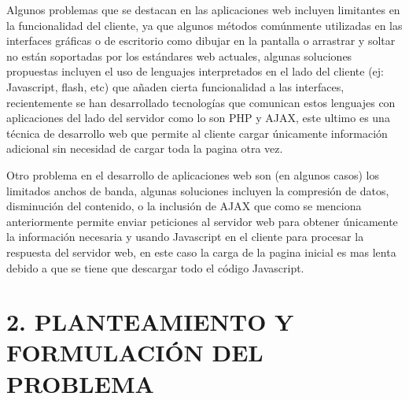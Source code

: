 \documentclass[12pt,letterpaper,oneside]{article}
\begin{document}
\bigskip

{\mdseries\upshape
Algunos problemas que se destacan en las aplicaciones web incluyen
limitantes en la funcionalidad del cliente, ya que algunos métodos
comúnmente utilizadas en las interfaces gráficas o de escritorio
como dibujar en la pantalla o arrastrar y soltar no están soportadas
por los estándares web actuales, algunas soluciones propuestas
incluyen el uso de lenguajes interpretados en el lado del cliente (ej:
Javascript, flash, etc) que añaden cierta funcionalidad a las
interfaces, recientemente se han desarrollado tecnologías que
comunican estos lenguajes con aplicaciones del lado del servidor como
lo son PHP y AJAX, este ultimo es una técnica de desarrollo web que
permite al cliente cargar únicamente información adicional sin
necesidad de cargar toda la pagina otra vez.}


\bigskip

{\mdseries\upshape
Otro problema en el desarrollo de aplicaciones web son (en algunos
casos) los limitados anchos de banda, algunas soluciones incluyen la
compresión de datos, disminución del contenido, o la inclusión de
AJAX que como se menciona anteriormente permite enviar peticiones al
servidor web para obtener únicamente la información necesaria y
usando Javascript en el cliente para procesar la respuesta del servidor
web, en este caso la carga de la pagina inicial es mas lenta debido a
que se tiene que descargar todo el código Javascript.}


\bigskip


\bigskip


\bigskip


\bigskip


\bigskip


\bigskip


\bigskip


\bigskip


\bigskip


\bigskip


\bigskip


\bigskip


\bigskip


\bigskip


\bigskip


\bigskip


\bigskip


\bigskip

\section{2. PLANTEAMIENTO Y FORMULACI\'ON DEL PROBLEMA}
\end{document}
